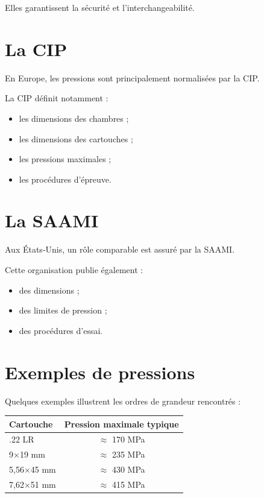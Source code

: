 Elles garantissent la sécurité et l'interchangeabilité.

\section{La CIP}

En Europe, les pressions sont principalement normalisées par la CIP.

La CIP définit notamment :

\begin{itemize}
    \item les dimensions des chambres ;
    \item les dimensions des cartouches ;
    \item les pressions maximales ;
    \item les procédures d'épreuve.
\end{itemize}

\section{La SAAMI}

Aux États-Unis, un rôle comparable est assuré par la SAAMI.

Cette organisation publie également :

\begin{itemize}
    \item des dimensions ;
    \item des limites de pression ;
    \item des procédures d'essai.
\end{itemize}

\section{Exemples de pressions}

Quelques exemples illustrent les ordres de grandeur rencontrés :

\begin{center}
\begin{tabular}{lc}
\hline
Cartouche & Pression maximale typique \\
\hline
.22 LR & $\approx$ 170 MPa \\
9×19 mm & $\approx$ 235 MPa \\
5,56×45 mm & $\approx$ 430 MPa \\
7,62×51 mm & $\approx$ 415 MPa \\
\hline
\end{tabular}
\end{center}

